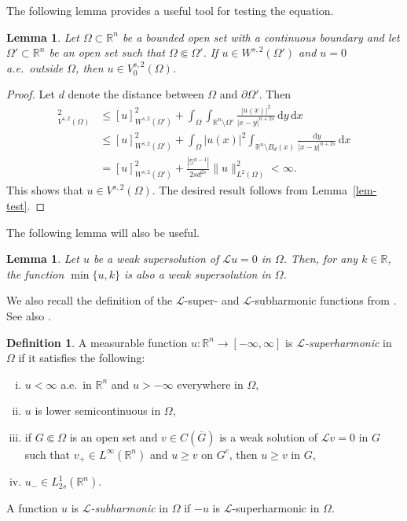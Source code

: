 \documentclass[11pt]{amsart}
\theoremstyle{plain}
\newtheorem{lemma}[theorem]{Lemma}
\theoremstyle{definition}
\newtheorem{definition}[theorem]{Definition}
\numberwithin{equation}{section}
\begin{document}
The following lemma provides a useful tool for testing the equation.

\begin{lemma}\label{lem-test-V}
Let $\Omega \subset \mathbb{R}^n$ be a bounded open set with a continuous boundary and let $\Omega' \subset \mathbb{R}^n$ be an open set such that $\Omega \Subset \Omega'$. If $u \in W^{s, 2}(\Omega')$ and $u=0$ a.e.\ outside $\Omega$, then $u \in V^{s, 2}_0(\Omega)$.
\end{lemma}

\begin{proof}
Let $d$ denote the distance between $\Omega$ and $\partial \Omega'$. Then
\begin{align*}
    [u]_{V^{s, 2}(\Omega)}^2
    &\leq [u]_{W^{s, 2}(\Omega')}^2 + \int_{\Omega} \int_{\mathbb{R}^n \setminus \Omega'} \frac{|u(x)|^2}{|x-y|^{n+2s}} \,\mathrm{d}y \,\mathrm{d}x \\
    &\leq [u]_{W^{s, 2}(\Omega')}^2 + \int_{\Omega} |u(x)|^2 \int_{\mathbb{R}^n \setminus B_d(x)} \frac{\mathrm{d}y}{|x-y|^{n+2s}} \,\mathrm{d}x \\
    &= [u]_{W^{s, 2}(\Omega')}^2 + \frac{|\mathbb{S}^{n-1}|}{2s d^{2s}} \|u\|_{L^2(\Omega)}^2 < \infty.
\end{align*}
This shows that $u \in V^{s, 2}(\Omega)$. The desired result follows from Lemma~\ref{lem-test}.
\end{proof}

The following lemma will also be useful.

\begin{lemma}\cite[Lemma~7]{KKP17}\label{lem-truncation}
Let $u$ be a weak supersolution of $\mathcal{L}u=0$ in $\Omega$. Then, for any $k \in \mathbb{R}$, the function $\min\{u, k\}$ is also a weak supersolution in $\Omega$.
\end{lemma}


We also recall the definition of the $\mathcal{L}$-super- and $\mathcal{L}$-subharmonic functions from \cite[Definition~8.1]{BBK24}. See also \cite[Definition~1]{KKP17}.

\begin{definition}\label{def-superharmonic}
A measurable function $u: \mathbb{R}^n \to [-\infty, \infty]$ is \emph{$\mathcal{L}$-superharmonic} in $\Omega$ if it satisfies the following:
\begin{enumerate}[(i)]
\item $u < \infty$ a.e.\ in $\mathbb{R}^n$ and $u>-\infty$ everywhere in $\Omega$,
\item $u$ is lower semicontinuous in $\Omega$,
\item if $G \Subset \Omega$ is an open set and $v \in C(\overline{G})$ is a weak solution of $\mathcal{L}v=0$ in $G$ such that $v_+ \in L^{\infty}(\mathbb{R}^n)$ and $u \geq v$ on $G^c$, then $u \geq v$ in $G$,
\item $u_- \in L_{2s}^1(\mathbb{R}^n)$.
\end{enumerate}
A function $u$ is \emph{$\mathcal{L}$-subharmonic} in $\Omega$ if $-u$ is $\mathcal{L}$-superharmonic in $\Omega$.
\end{definition}
\end{document}
